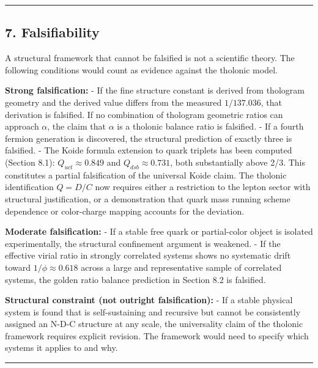 \documentclass[
  11pt,
  letterpaper,
]{article}
\begin{document}
\begin{center}\rule{0.5\linewidth}{0.5pt}\end{center}

\subsection{7. Falsifiability}\label{falsifiability}

A structural framework that cannot be falsified is not a scientific
theory. The following conditions would count as evidence against the
tholonic model.

\textbf{Strong falsification:} - If the fine structure constant is
derived from thologram geometry and the derived value differs from the
measured \(1/137.036\), that derivation is falsified. If no combination
of thologram geometric ratios can approach \(\alpha\), the claim that
\(\alpha\) is a tholonic balance ratio is falsified. - If a fourth
fermion generation is discovered, the structural prediction of exactly
three is falsified. - The Koide formula extension to quark triplets has
been computed (Section 8.1): \(Q_{uct} \approx 0.849\) and
\(Q_{dsb} \approx 0.731\), both substantially above 2/3. This
constitutes a partial falsification of the universal Koide claim. The
tholonic identification \(Q = D/C\) now requires either a restriction to
the lepton sector with structural justification, or a demonstration that
quark mass running scheme dependence or color-charge mapping accounts
for the deviation.

\textbf{Moderate falsification:} - If a stable free quark or
partial-color object is isolated experimentally, the structural
confinement argument is weakened. - If the effective virial ratio in
strongly correlated systems shows no systematic drift toward
\(1/\phi \approx 0.618\) across a large and representative sample of
correlated systems, the golden ratio balance prediction in Section 8.2
is falsified.

\textbf{Structural constraint (not outright falsification):} - If a
stable physical system is found that is self-sustaining and recursive
but cannot be consistently assigned an N-D-C structure at any scale, the
universality claim of the tholonic framework requires explicit revision.
The framework would need to specify which systems it applies to and why.

\begin{center}\rule{0.5\linewidth}{0.5pt}\end{center}
\end{document}
